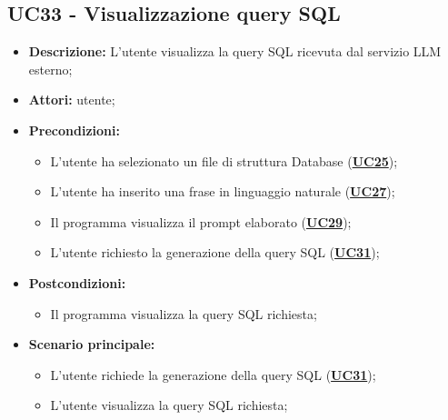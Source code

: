 \subsection{UC33 - Visualizzazione query SQL}
\label{sec:UC33}
\begin{itemize}
	\item \textbf{Descrizione:} L’utente visualizza la query SQL ricevuta dal servizio LLM esterno;
	\item \textbf{Attori:} utente;
	\item \textbf{Precondizioni:} 
	\begin{itemize}
		\item L’utente ha selezionato un file di struttura Database (\hyperref[sec:UC25]{\textbf{UC25}});
		\item L’utente ha inserito una frase in linguaggio naturale (\hyperref[sec:UC27]{\textbf{UC27}});
		\item Il programma visualizza il prompt elaborato (\hyperref[sec:UC29]{\textbf{UC29}});
		\item L’utente richiesto la generazione della query SQL (\hyperref[sec:UC31]{\textbf{UC31}});
	\end{itemize}
	\item \textbf{Postcondizioni:} 
	\begin{itemize}
		\item Il programma visualizza la query SQL richiesta;
	\end{itemize}
	\item \textbf{Scenario principale:} 
	\begin{itemize}
		\item L'utente richiede la generazione della query SQL (\hyperref[sec:UC31]{\textbf{UC31}});
		\item L'utente visualizza la query SQL richiesta;
	\end{itemize}
\end{itemize}
